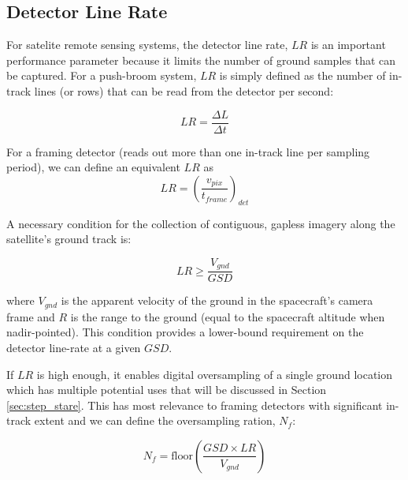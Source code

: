 \documentclass[10pt,journal]{IEEEtran}  %
\begin{document}
\subsection{Detector Line Rate}
For satelite remote sensing systems, the detector line rate, $LR$ is an important performance parameter because it limits the number of ground samples that can be captured.  For a push-broom system, $LR$ is simply defined as the number of in-track lines (or rows) that can be read from the detector per second:

$$LR = \frac{\Delta L}{\Delta t}$$

For a framing detector (reads out more than one in-track line per sampling period), we can define an equivalent $LR$ as
\begin{equation}
\label{eq:lr_framing}    
LR = \left(\frac{v_{pix}}{t_{frame}}\right)_{det}
\end{equation}

A necessary condition for the collection of contiguous, gapless imagery along the satellite's ground track is:

\begin{equation}
    LR \geq\frac{V_{gnd}}{GSD}
\end{equation}

where $V_{gnd}$ is the apparent velocity of the ground in the spacecraft's camera frame and $R$ is the range to the ground (equal to the spacecraft altitude when nadir-pointed).  This condition provides a lower-bound requirement on the detector line-rate at a given $GSD$.  

If $LR$ is high enough, it enables digital oversampling of a single ground location which has multiple potential uses that will be discussed in Section \ref{sec:step_stare}.  This has most relevance to framing detectors with significant in-track extent and we can define the oversampling ration, $N_f$:

\begin{equation}
    N_f = \text{floor}\left(\frac{GSD \times LR}{V_{gnd}}\right)
\end{equation}



\end{document}
